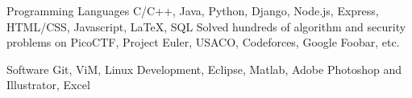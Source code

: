 

\begin{cvskills}

  \cvskill
    {Programming Languages} %
    {C/C++, Java, Python, Django, Node.js, Express, HTML/CSS, Javascript, LaTeX, SQL \newline
    Solved hundreds of algorithm and security problems on PicoCTF, Project Euler, USACO, Codeforces, Google Foobar, etc.} %

 \cvskill
    {Software} %
    {Git, ViM, Linux Development, Eclipse, Matlab, Adobe Photoshop and Illustrator, Excel} %

%
%
%
%



\end{cvskills}
